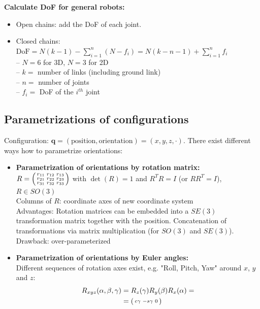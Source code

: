 \begin{multicols*}{2}
\textbf{Calculate DoF for general robots:}
\begin{itemize}
	\item Open chains: add the DoF of each joint.
	\item Closed chains:\\
	$\text{DoF} = N(k-1) - \sum_{i=1}^{n} (N-f_i) = N(k-n-1) + \sum_{i=1}^{n} f_i$ \\
	– $N=6$ for 3D, $N=3$ for 2D\\
	– $k =$ number of links (including ground link)\\
	– $n =$ number of joints\\
	– $f_i =$ DoF of the $i^{th}$ joint
\end{itemize}

\subsection{Parametrizations of configurations}
Configuration: $\mathbold{q}=(\text{position}, \text{orientation})=(x,y,z,\cdot)$.
There exist different ways how to parametrize orientations:
\begin{itemize}
	\item \textbf{Parametrization of orientations by rotation matrix:}\\
		$R=
		\begin{psmallmatrix}
			r_{11} & r_{12} & r_{13}\\
			r_{21} & r_{22} & r_{23}\\
			r_{31} & r_{32} & r_{33}
		\end{psmallmatrix}$
		with $\det(R)=1$ and $R^T R=I$ (or $R R^T=I$), $R \in SO(3)$ \\
		Columns of $R$: coordinate axes of new coordinate system \\
		Advantages: Rotation matrices can be embedded into a $SE(3)$ transformation matrix together with the position. Concatenation of transformations via matrix multiplication (for $SO(3)$ and $SE(3)$). \\
		Drawback: over-parameterized
	\item \textbf{Parametrization of orientations by Euler angles:}\\
	Different sequences of rotation axes exist, e.g. "Roll, Pitch, Yaw" around $x$, $y$ and $z$:
	\begin{align*}
		R_{xyz}(\alpha, \beta, \gamma) &= R_z(\gamma)R_y(\beta)R_x(\alpha)=\\
		&=
		\begin{psmallmatrix}
			c\gamma & -s\gamma & 0\\

\end{psmallmatrix}
\end{align*}
\end{itemize}
\end{multicols*}
